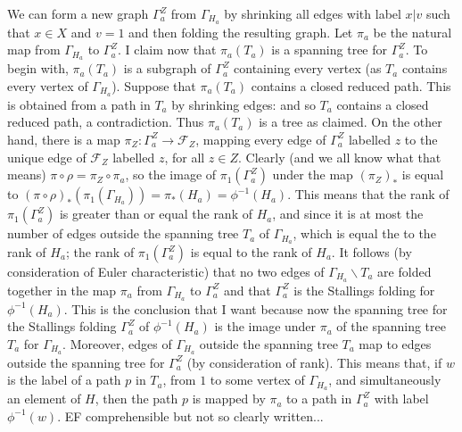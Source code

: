 \documentclass[a4paper,12pt]{article}
\newcommand{\G}{\Gamma }
\newcommand{\cF}{{\cal{F}}}
\numberwithin{equation}{section}
\numberwithin{figure}{section}
\renewcommand{\cF}{\mathcal{F}}
\newcommand{\maps}{\rightarrow}
\newcommand{\bs}{\backslash}
\newenvironment{bl}{\noindent\color{blue} EF }{}
\newcommand{\li}[1]{\begin{bl} #1 \end{bl}}
\begin{document}
We can form a new graph $\G_a^Z$ from $\G_{H_a}$ by shrinking all edges with label $x|v$ such
that $x\in X$ and $v=1$ and then folding the resulting graph.  Let $\pi_a$ be the natural map from $\G_{H_a}$ to $\G_a^Z$.  I claim now that $\pi_a(T_a)$ is a spanning tree for $\G_a^Z$. To begin with,
$\pi_a(T_a)$ is a subgraph of $\G_a^Z$ containing every vertex (as $T_a$ contains every vertex
of $\G_{H_a}$). Suppose that $\pi_a(T_a)$ contains a closed reduced path. This is obtained from
a path in $T_a$ by shrinking edges: and so $T_a$ contains a closed reduced path, a contradiction.
Thus $\pi_a(T_a)$ is a tree as claimed. On the other hand, there is a map $\pi_Z:\G_a^Z\maps
\cF_Z$, mapping every edge of $\G_a^Z$ labelled $z$ to the unique edge of $\cF_Z$ labelled $z$,
for all $z\in Z$. Clearly (and we all know what that means) $\pi\circ \rho=\pi_Z\circ \pi_a$, 
so the image of $\pi_1(\G_a^Z)$ under the map $(\pi_Z)_*$ is equal to 
$(\pi\circ\rho)_*(\pi_1(\G_{H_a}))=\pi_*(H_a)=\phi^{-1}(H_a)$. This means that the
rank of $\pi_1(\G_a^Z)$ is greater than or equal the rank of $H_a$, and since it is at most
the number of edges outside the spanning tree $T_a$ of $\G_{H_a}$, which is equal the to 
the rank of $H_a$; the rank of $\pi_1(\G_a^Z)$ is equal to the rank of $H_a$. It follows
(by consideration of Euler characteristic) that no two edges of $\G_{H_a}\bs T_a$ are folded
together in the map $\pi_a$ from $\G_{H_a}$ to $\G_a^Z$ and that $\G_a^Z$ is the Stallings
folding for $\phi^{-1}(H_a)$. This is the conclusion that I want because now the spanning
tree for the Stallings folding $\G_a^Z$ of  $\phi^{-1}(H_a)$ is the image under $\pi_a$ of the 
spanning tree $T_a$ for $\G_{H_a}$. Moreover, edges of $\G_{H_a}$ outside the spanning tree $T_a$ map to edges
outside the spanning tree for $\G_a^Z$ (by consideration of rank).
This means that, if $w$ is the label of a path $p$ in $T_a$, 
from $1$ to some vertex
of $\G_{H_a}$, and simultaneously an element of $H$, then the path
$p$ is mapped by $\pi_a$ to a path in $\G_a^Z$ with label $\phi^{-1}(w)$. 
\li{comprehensible but not so clearly written...}
\end{document}
